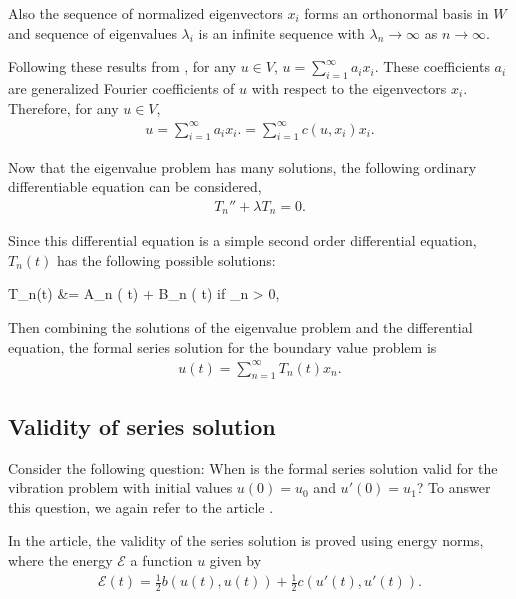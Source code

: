 		Also the sequence of normalized eigenvectors ${x_i}$ forms an orthonormal basis in $W$ and sequence of eigenvalues ${\lambda_i}$ is an infinite sequence with $\lambda_n \rightarrow \infty$ as $n \rightarrow \infty$. 

		Following these results from \cite{CVV18}, for any $u \in V$, $\displaystyle u = \sum_{i=1}^{\infty} a_i x_i$. These coefficients $a_i$ are generalized Fourier coefficients of $u$ with respect to the eigenvectors $x_i$. Therefore, for any $u \in V$,
		\begin{eqnarray*}
			u = \sum_{i=1}^{\infty} a_i x_i. = \sum_{i=1}^{\infty} c(u, x_i)x_i.
		\end{eqnarray*}

		Now that the eigenvalue problem has many solutions, the following ordinary differentiable equation can be considered,
		\begin{eqnarray*}
			T_n'' + \lambda T_n = 0. 
		\end{eqnarray*}

		Since this differential equation is a simple second order differential equation, $T_n(t)$ has the following possible solutions:
		\begin{flalign}
			T_n(t) &=  A_n \cos( t) + B_n \sin( t) \quad \textrm{ if } \lambda_n > 0, \label{lambda_1}
		\end{flalign}

		Then combining the solutions of the eigenvalue problem and the differential equation, the formal series solution for the boundary value problem is
		\begin{eqnarray}
			u(t) = \sum_{n=1}^{\infty} T_n(t)x_n. \label{eq:1D_Model:ModalAnalysisSeriesSolution}
		\end{eqnarray}


	\subsection*{Validity of series solution}
		Consider the following question: When is the formal series solution valid for the vibration problem with initial values $u(0) = u_0$ and $u'(0) = u_1$? To answer this question, we again refer to the article \cite{CVV18}.

		In the article, the validity of the series solution is proved using energy norms, where the energy $\mathcal{E}$ a function $u$ given by \label{sym:Energy}
		\begin{eqnarray}
			\mathcal{E} (t) = \frac{1}{2} b(u(t), u(t)) + \frac{1}{2} c(u'(t), u'(t)). \label{eq:1D_Model:ModalAnalysisEnergy}
		\end{eqnarray}

